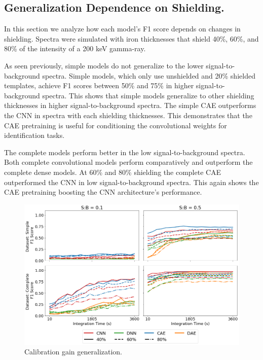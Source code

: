 \subsection{Generalization Dependence on Shielding.}

In this section we analyze how each model's F1 score depends on changes in shielding. Spectra were simulated with iron thicknesses that shield 40\%, 60\%, and 80\% of the intensity of a 200 keV gamma-ray.

As seen previously, simple models do not generalize to the lower signal-to-background spectra. Simple models, which only use unshielded and 20\% shielded templates, achieve F1 scores between 50\% and 75\% in higher signal-to-background spectra. This shows that simple models generalize to other shielding thicknesses in higher signal-to-background spectra. The simple CAE outperforms the CNN in spectra with each shielding thicknesses. This demonstrates that the CAE pretraining is useful for conditioning the convolutional weights for identification tasks. 

The complete models perform better in the low signal-to-background spectra. Both complete convolutional models perform comparatively and outperform the complete dense models. At 60\% and 80\% shielding the complete CAE outperformed the CNN in low signal-to-background spectra. This again shows the CAE pretraining boosting the CNN architecture's performance.



\begin{figure}[H]
	\centering
	\includegraphics[width=1.0\linewidth]{images/sim-generalization-ironshield}
	\caption{Calibration gain generalization.}
	\label{fig:sim-generalization-ironshield}
\end{figure}

